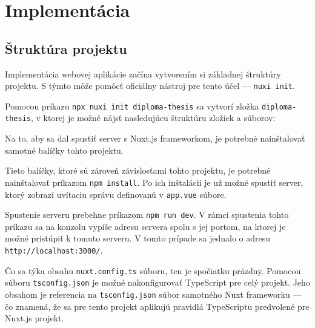 \chapter {Implementácia}

\section {Štruktúra projektu}
Implementácia webovej aplikácie začína vytvorením si základnej štruktúry projektu. S týmto môže pomôcť oficiálny nástroj pre tento účel --- \texttt{nuxi init}.

Pomocou príkazu \texttt{npx nuxi init diploma-thesis} sa vytvorí zložka \texttt{diploma-thesis}, v ktorej je možné nájsť nasledujúcu štruktúru zložiek a súborov:

\begin{figure}[H]
\end{figure}

Na to, aby sa dal spustiť server s Nuxt.js frameworkom, je potrebné nainštalovať samotné balíčky tohto projektu.

\clearpage

Tieto balíčky, ktoré sú zároveň závislosťami tohto projektu, je potrebné nainštalovať príkazom \texttt{npm install}. Po ich inštalácii je už možné spustiť server, ktorý zobrazí uvítaciu správu definovanú v \texttt{app.vue} súbore.

Spustenie serveru prebehne príkazom \texttt{npm run dev}. V rámci spustenia tohto príkazu sa na konzolu vypíše adresu servera spolu s jej portom, na ktorej je možné pristúpiť k tomuto serveru. V tomto prípade sa jednalo o adresu \texttt{http://localhost:3000/}.

Čo sa týka obsahu \texttt{nuxt.config.ts} súboru, ten je spočiatku prázdny. Pomocou súboru \texttt{tsconfig.json} je možné nakonfigurovať TypeScript pre celý projekt. Jeho obsahom je referencia na \texttt{tsconfig.json} súbor samotného Nuxt frameworku --- čo znamená, že sa pre tento projekt aplikujú pravidlá TypeScriptu predvolené pre Nuxt.js projekt.

